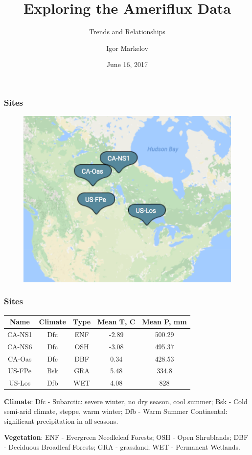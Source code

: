 \documentclass{beamer}
\title{Exploring the Ameriflux Data}
\subtitle{Trends and Relationships}
\author{Igor Markelov}
\institute{Upscaling Group Meeting}
\date{June 16, 2017}
\begin{document}
\begin{frame}
\titlepage
\end{frame}


\begin{frame}
\frametitle{Sites}
\begin{figure}
\includegraphics[width=\textwidth]{sites.png}
\end{figure}
\end{frame}


\begin{frame}
\frametitle{Sites}

\begin{center}
\begin{tabular}{| c | c | c | c | c |}
\hline
Name & Climate & Type & Mean T, C & Mean P, mm \\ \hline
CA-NS1 & Dfc & ENF & -2.89 & 500.29 \\\hline
CA-NS6 & Dfc & OSH & -3.08 & 495.37 \\\hline
CA-Oas & Dfc & DBF & 0.34 & 428.53 \\\hline
US-FPe & Bsk & GRA & 5.48 & 334.8 \\\hline
US-Los &  Dfb& WET &   4.08 & 828\\\hline

\hline
\end{tabular}
\end{center}


\textbf{Climate}:
Dfc - Subarctic: severe winter, no dry season, cool summer;
Bsk - Cold semi-arid climate, steppe, warm winter;
Dfb - Warm Summer Continental: significant precipitation in all seasons.

\textbf{Vegetation}:
ENF - Evergreen Needleleaf Forests;
OSH - Open Shrublands;
DBF - Deciduous Broadleaf Forests;
GRA - grassland;
WET - Permanent Wetlands.


\end{frame}
\end{document}

